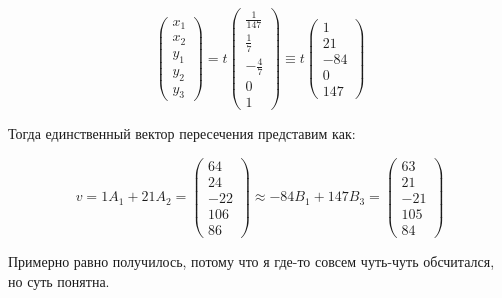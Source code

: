 \documentclass[12pt, a4paper]{article}
\begin{document}
    \begin{equation}
        \begin{pmatrix}
            x_1 \\ x_2 \\ y_ 1 \\ y_2 \\ y_3
        \end{pmatrix} = t \begin{pmatrix}
            \frac{1}{147} \\ \frac17 \\ -\frac{4}{7} \\ 0 \\ 1
        \end{pmatrix} \equiv t \begin{pmatrix}
            1 \\ 21 \\ -84 \\ 0 \\ 147
        \end{pmatrix}
    \end{equation}

    Тогда единственный вектор пересечения представим как:

    \begin{equation}
        v = 1 A_1 + 21 A_2 = \begin{pmatrix}
            64 \\ 24 \\ -22 \\ 106 \\ 86
        \end{pmatrix} \approx -84 B_1 + 147 B_3 = \begin{pmatrix}
            63 \\ 21 \\ -21 \\ 105 \\ 84
        \end{pmatrix}
    \end{equation}

    Примерно равно получилось, потому что я где-то 
    совсем чуть-чуть обсчитался, но суть понятна.
\end{document}
